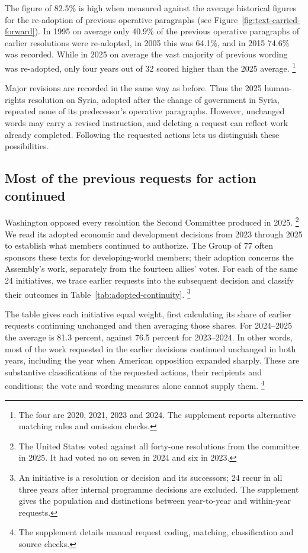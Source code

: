 \documentclass[12pt,authoryear]{elsarticle}
\begin{document}
The figure of 82.5\% is high when measured against the average historical figures for the re-adoption of previous operative paragraphs (see Figure~\ref{fig:text-carried-forward}). In 1995 on average only 40.9\% of the previous operative paragraphs of earlier resolutions were re-adopted, in 2005 this was 64.1\%, and in 2015 74.6\% was recorded. While in 2025 on average the vast majority of previous wording was re-adopted, only four years out of 32 scored higher than the 2025 average. \footnote{The four are 2020, 2021, 2023 and 2024. The supplement reports alternative matching rules and omission checks.}

Major revisions are recorded in the same way as before. Thus the 2025 human-rights resolution on Syria, adopted after the change of government in Syria, repeated none of its predecessor's operative paragraphs. However, unchanged words may carry a revised instruction, and deleting a request can reflect work already completed. Following the requested actions lets us distinguish these possibilities.

\subsection{Most of the previous requests for action continued}

Washington opposed every resolution the Second Committee produced in 2025. \footnote{The United States voted against all forty-one resolutions from the committee in 2025. It had voted no on seven in 2024 and six in 2023.} We read its adopted economic and development decisions from 2023 through 2025 to establish what members continued to authorize. The Group of 77 often sponsors these texts for developing-world members; their adoption concerns the Assembly's work, separately from the fourteen allies' votes. For each of the same 24 initiatives, we trace earlier requests into the subsequent decision and classify their outcomes in Table~\ref{tab:adopted-continuity}. \footnote{An initiative is a resolution or decision and its successors; 24 recur in all three years after internal programme decisions are excluded. The supplement gives the population and distinctions between year-to-year and within-year requests.}

The table gives each initiative equal weight, first calculating its share of earlier requests continuing unchanged and then averaging those shares. For 2024--2025 the average is 81.3 percent, against 76.5 percent for 2023--2024. In other words, most of the work requested in the earlier decisions continued unchanged in both years, including the year when American opposition expanded sharply. These are substantive classifications of the requested actions, their recipients and conditions; the vote and wording measures alone cannot supply them. \footnote{The supplement details manual request coding, matching, classification and source checks.}
\end{document}
